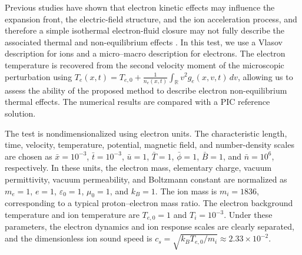 \documentclass[pdflatex,final,10pt]{article}
\newcommand{\Fabrice}[1]{#1}
\begin{document}
Previous studies have shown that electron kinetic effects may influence the expansion front, the electric-field structure, and the ion acceleration process, and therefore a simple isothermal electron-fluid closure may not fully describe the associated thermal and non-equilibrium effects \cite{grismayer2008electron}. In this test, we use a Vlasov description for ions and a micro--macro description for electrons. The electron temperature is recovered from the second velocity moment of the microscopic perturbation \Fabrice{using $T_e(x,t)
    =
    T_{e,0}
    +
    \frac{1}{n_e(x,t)}
    \int_{\mathbb{R}} v^2 g_e(x,v,t)\,dv$,} allowing us to assess the ability of the proposed method to describe electron non-equilibrium thermal effects. The numerical results are compared with a PIC reference solution.

The test is nondimensionalized using electron units. The characteristic length, time, velocity, temperature, potential, magnetic field, and number-density scales are chosen as $\bar{x}=10^{-3}$, $\bar{t}=10^{-3}$, $\bar{u}=1$, $\bar{T}=1$, $\bar{\phi}=1$, $\bar{B}=1$, and $\bar{n}=10^6$, respectively. In these units, the electron mass, elementary charge, vacuum permittivity, vacuum permeability, and Boltzmann constant are normalized as $m_e=1$, $e=1$, $\varepsilon_0=1$, $\mu_0=1$, and $k_B=1$. The ion mass is $m_i=1836$, corresponding to a typical proton--electron mass ratio. The electron background temperature and ion temperature are $T_{e,0}=1$ and $T_i=10^{-3}$. Under these parameters, the electron dynamics and ion response scales are clearly separated, and the dimensionless ion sound speed is $c_s=\sqrt{k_BT_{e,0}/m_i}\approx 2.33\times10^{-2}$.
\end{document}
